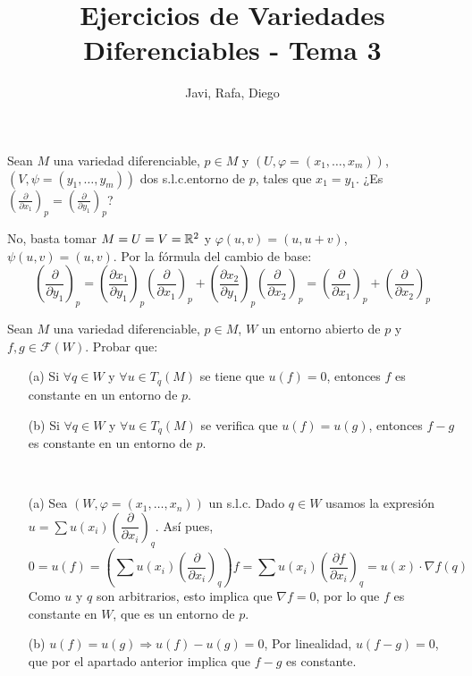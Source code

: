 \documentclass[twoside]{article}
\begin{document}
\title{Ejercicios de Variedades Diferenciables - Tema 3}
\author{Javi, Rafa, Diego}
\maketitle



\begin{ejercicio}{1}\label{1}
Sean $M$ una variedad diferenciable, $p \in M$ y $(U, \varphi = (x_1, \dots , x_m))$, $(V, \psi =
(y_1, \dots , y_m))$ dos s.l.c.entorno de $p$, tales que $x_1 = y_1$. ¿Es $\left(
\frac{\partial}{\partial x_1}\right)_p = \left(\frac{\partial}{\partial y_1}\right)_p$?
\end{ejercicio}
\begin{solucion}
No, basta tomar $M=U=V=\mathbb{R}^2$ y $φ(u,v)=(u,u+v)$, $ψ(u,v)=(u,v)$.
Por la fórmula del cambio de base:
\[ \left(\frac{\partial}{\partial y_1}\right)_p = \left(\frac{\partial x_1}{\partial y_1}\right)_p \left(\frac{\partial}{\partial x_1}\right)_p +  \left(\frac{\partial x_2}{\partial y_1}\right)_p  \left(\frac{\partial}{\partial x_2}\right)_p = \left(\frac{\partial}{\partial x_1}\right)_p + \left(\frac{\partial}{\partial x_2}\right)_p\]
\end{solucion}
\newpage

\begin{ejercicio}{2}
Sean $M$ una variedad diferenciable, $p \in M$, $W$ un entorno abierto de $p$ y
$f,g \in \mathcal{F}(W)$. Probar que:

\begin{itemize}
\item[(a)] Si $\forall q \in W$ y $\forall u \in  T_q(M)$ se tiene que $u(f) = 0$, entonces $f$ es constante
en un entorno de $p$.
\item[(b)] Si $\forall q \in W$ y $\forall u \in T_q(M)$ se verifica que $u(f) = u(g)$, entonces $f - g$ es
constante en un entorno de $p$.
\end{itemize}
\end{ejercicio}
\begin{solucion}\
\begin{itemize}
\item[(a)] Sea $(W,\varphi=(x_1,\dots,x_n))$ un s.l.c. Dado $q\in W$ usamos la expresión $u = \sum u(x_i) \left(\dfrac{\partial}{\partial x_i}\right)_q$. Así pues, 
\[
0=u(f) = \left(\sum u(x_i) \left(\dfrac{\partial}{\partial x_i}\right)_q\right)f=\sum u(x_i) \left(\frac{\partial f}{\partial x_i}\right)_q = u(x)\cdot\nabla f(q)
\]
Como $u$ y $q$ son arbitrarios, esto implica que $\nabla f=0$, por lo que $f$ es constante en $W$, que es un entorno de $p$. 
\item[(b)] $u(f) = u(g)\Rightarrow u(f)-u(g)=0$, Por linealidad, $u(f-g)=0$, que por el apartado anterior implica que $f-g$ es constante.
\end{itemize}
\end{solucion}
\end{document}
